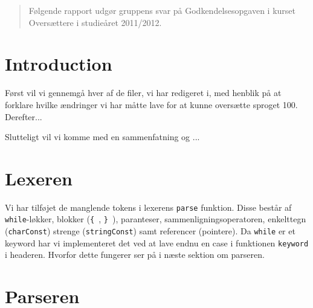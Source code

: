 \documentclass[12pt,a4paper,danish]{article}
\begin{document}
\maketitle       %

\renewcommand\abstractname{Abstract}%

\begin{abstract}
Følgende rapport udgør gruppens svar på Godkendelsesopgaven i kurset Oversættere i studieåret 2011/2012.
\end{abstract}

\section*{Introduction}%

Først vil vi gennemgå hver af de filer, vi har redigeret i, med henblik på at forklare hvilke ændringer vi har måtte lave for at kunne oversætte sproget 100.
Derefter...

Slutteligt vil vi komme med en sammenfatning og ...


\section*{Lexeren}%

Vi har tilføjet de manglende tokens i lexerens \texttt{parse} funktion. Disse består af \texttt{while}-løkker, blokker (\texttt{\{ }, \texttt{\} }), paranteser, sammenligningsoperatoren,  enkelttegn (\texttt{charConst}) strenge (\texttt{stringConst}) samt referencer (pointere). Da \texttt{while} er et keyword har vi implementeret det ved at lave endnu en case i funktionen \texttt{keyword} i headeren.
Hvorfor dette fungerer ser på i næste sektion om parseren.

\section*{Parseren}%
\end{document}
